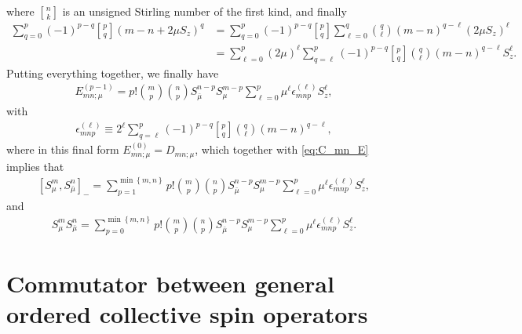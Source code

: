 \documentclass[aps,notitlepage,nofootinbib,11pt]{revtex4-1}
\newcommand{\p}[1]{\left(#1\right)} %
\renewcommand{\sp}[1]{\left[#1\right]} %
\renewcommand{\set}[1]{\left\{#1\right\}} %
\newcommand{\bmu}{{\bar\mu}}
\newcommand{\1}{\mathds{1}}
\begin{document}
where ${ n \brack k }$ is an unsigned Stirling number of the first
kind, and finally
\begin{align}
  \sum_{q=0}^p \p{-1}^{p-q} { p \brack q } \p{m-n+2\mu S_z}^q
  &= \sum_{q=0}^p \p{-1}^{p-q} { p \brack q } \sum_{\ell=0}^q
  { q \choose \ell } \p{m-n}^{q-\ell} \p{2\mu S_z}^\ell \\
  &= \sum_{\ell=0}^p \p{2\mu}^\ell \sum_{q=\ell}^p \p{-1}^{p-q}
  { p \brack q } { q \choose \ell } \p{m-n}^{q-\ell} S_z^\ell.
\end{align}
Putting everything together, we finally have
\begin{align}
  E_{mn;\mu}^{(p-1)}
  = p! { m \choose p } { n \choose p }
  S_\bmu^{n-p} S_\mu^{m-p} \sum_{\ell=0}^p
  \mu^\ell \epsilon_{mnp}^{(\ell)} S_z^\ell,
\end{align}
with
\begin{align}
  \epsilon_{mnp}^{(\ell)}
  \equiv 2^\ell \sum_{q=\ell}^p \p{-1}^{p-q}
  { p \brack q } { q \choose \ell } \p{m-n}^{q-\ell},
  \label{eq:epsilon}
\end{align}
where in this final form $E_{mn;\mu}^{(0)} = D_{mn;\mu}$, which
together with \eqref{eq:C_mn_E} implies that
\begin{align}
  \sp{S_\mu^m, S_\bmu^n}_-
  = \sum_{p=1}^{\min\set{m,n}}
  p! { m \choose p } { n \choose p } S_\bmu^{n-p} S_\mu^{m-p}
  \sum_{\ell=0}^p \mu^\ell \epsilon_{mnp}^{(\ell)} S_z^\ell,
  \label{eq:comm_mu}
\end{align}
and
\begin{align}
  S_\mu^m S_\bmu^n
  = \sum_{p=0}^{\min\set{m,n}}
  p! { m \choose p } { n \choose p } S_\bmu^{n-p} S_\mu^{m-p}
  \sum_{\ell=0}^p \mu^\ell \epsilon_{mnp}^{(\ell)} S_z^\ell.
  \label{eq:push_mu_nu}
\end{align}



\section{Commutator between general ordered collective spin operators}
\label{sec:comm_general}
\end{document}
